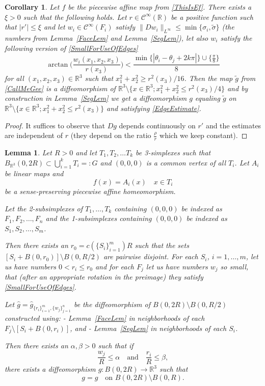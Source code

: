 \documentclass[12pt,a4paper]{amsart}
\theoremstyle{plain}
\newtheorem{lemma}[thm]{Lemma}
\newtheorem{corollary}[thm]{Corollary}
\theoremstyle{definition}
\numberwithin{equation}{section}
\def\er{\mathbb R}
\begin{document}
	\begin{corollary}\label{SegFix}
		Let $f$ be the piecewise affine map from \eqref{ThisIsEf}. There exists a $\xi>0$ such that the following holds. Let $r\in \mathcal{C}^{\infty}(\er)$ be a positive function such that $|r'|\leq \xi$ and let $w_i\in \mathcal{C}^{\infty}(F_i)$ satisfy $\|Dw_i\|_{L^\infty}\leq \min\{\sigma_i, \tilde{\sigma}\}$ (the numbers from Lemma~\ref{FaceLem} and Lemma~\ref{SegLem}), let also $w_i$ satisfy the following version of \eqref{SmallForUseOfEdges}
		\begin{equation}\label{SmallForUseOfEdges2}
			\arctan\Big(\frac{w_i(x_1,x_2,x_3)}{r(x_3)}\Big)< \frac{\min\{|\theta_i - \theta_j + 2k\pi| \} \cup \{\tfrac{\pi}{8}\}}{8}
		\end{equation}
		for all $(x_1,x_2,x_3)\in \er^3$ such that $x_1^2+x_2^2 \geq r^2(x_3)/16$. Then the map $\tilde{g}$ from  \eqref{CallMeGee} is a diffeomorphism of $\er^3\setminus \{x\in \er^3; x^2_1+x^2_2\leq r^2(x_3)/4\}$ and by construction in Lemma~\ref{SegLem} we get a diffeomorphism $g$ equaling $\tilde{g}$ on $\er^3\setminus \{x\in \er^3; x^2_1+x^2_2\leq r^2(x_3)\}$ and satisfying \eqref{EdgeEstimate}.
	\end{corollary}
	\begin{proof}
		It suffices to observe that $Dg$ depends continuously on $r'$ and the estimates are independent of $r$ (they depend on the ratio $\frac{\rho}{r}$ which we keep constant).
	\end{proof}
	
	\begin{lemma}\label{VertLem}
		Let $R>0$ and let $T_1,T_2,\dots T_k$ be 3-simplexes such that $B_{\er^3}(0,2R)\subset\bigcup_{i=1}^kT_i =:G$ and $(0,0,0)$ is a common vertex of all $T_i$. Let $A_i$ be linear maps and
		$$
		f(x) = A_i(x)\quad x\in T_i
		$$
		be a sense-preserving piecewise affine homeomorphism.
		
		Let the 2-subsimplexes of $T_1, \dots, T_k$ containing $(0,0,0)$ be indexed as $F_1,F_2,\dots, F_n$ and the 1-subsimplexes containing $(0,0,0)$ be indexed as $S_1,S_2,\dots, S_m$.
		
		Then there exists an $r_0 = c(\{S_i\}_{i=1}^m)R$ such that the sets $[S_i+B(0,r_0)]\setminus B(0,R/2)$ are pairwise disjoint. For each $S_i$, $i=1,\dots, m$, let us have numbers  $0<r_i \leq r_0$ and for each $F_j$ let us have numbers $w_j$ so small, that (after an appropriate rotation in the preimage) they satisfy \eqref{SmallForUseOfEdges}.
		
		Let $\hat{g} = \hat{g}_{\{r_i\}_{i=1}^m, \{w_j\}_{j=1}^n}$ be the diffeomorphism of $B(0,2R)\setminus B(0,R/2)$ constructed using: - Lemma~\ref{FaceLem} in neighborhoods of each $ F_j \setminus [S_i + B(0, r_i)]$, and
		- Lemma~\ref{SegLem} in neighborhoods of each $ S_i$.
		
		Then there exists an $\alpha, \beta>0$ such that if
		$$
		\frac{w_j}{R} \leq \alpha \quad \text{and} \quad \frac{r_i}{R}\leq \beta,
		$$
		there exists a diffeomorphism $ g: B(0,2R) \to \mathbb{R}^3$ such that
		$$
		g = \hat{g} \quad \text{on } B(0,2R) \setminus B(0,R).
		$$
	\end{lemma}
	
\end{document}
